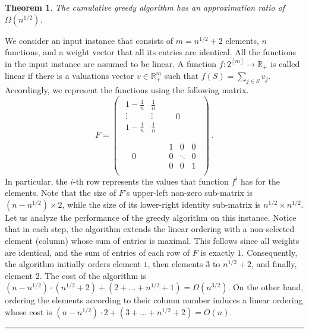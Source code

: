 \documentclass[11pt]{article}
\theoremstyle{plain}
\newtheorem{theorem}{Theorem}[section]
\theoremstyle{definition}
\newcommand{\qedsymb}{\hfill{\rule{2mm}{2mm}}}
\renewenvironment{proof}{\begin{trivlist} \item[\hspace{\labelsep}{\bf \noindent Proof.\/}] }{\qedsymb\end{trivlist}}\newenvironment{proofof}[1]{\begin{trivlist} \item[\hspace{\labelsep}{\bf \noindent Proof of #1.\/}] }{\qedsymb\end{trivlist}}\newenvironment{MyEqn}[1]{\setlength\arraycolsep{2pt}\begin{eqnarray*} #1}{\end{eqnarray*}}
\newcommand{\bbR}{\mathbb{R}}
\begin{document}
\begin{theorem} \label{thm:NonAdaptiveFail}
The cumulative greedy algorithm has an approximation ratio of
$\Omega(n^{1/2})$.
\end{theorem}
\begin{proof}
We consider an input instance that consists of $m = n^{1/2} + 2$
elements, $n$ functions, and a weight vector that all its entries
are identical. All the functions in the input instance are assumed
to be linear. A function $f: 2^{[m]} \to \bbR_+$ is called linear
if there is a valuations vector $v \in \bbR_+^m$ such that $f(S) =
\sum_{j \in S} v_j$. Accordingly, we represent the functions using
the following matrix.
$$
F = \left(
    \begin{array}{cc}
    \begin{array}{cc}
    1 - \frac{1}{n} & \frac{1}{n} \\
    \vdots&\vdots\\
    1 - \frac{1}{n} & \frac{1}{n} \\
    \end{array} &
    \begin{array}{ccc}
    \\
    & 0 & \\
    \\
    \end{array} \\
    \begin{array}{cc}
    \\
    & 0 \\
    \\
    \end{array} &
    \begin{array}{ccc}
    1 & 0 & 0 \\
    0 & \ddots & 0 \\
    0 & 0 & 1 \\
    \end{array}
    \end{array}
    \right) \ .
$$
In particular, the $i$-th row represents the values that function
$f^i$ has for the elements. Note that the size of $F$'s upper-left
non-zero sub-matrix is $(n - n^{1/2}) \times 2$, while the size of
its lower-right identity sub-matrix is $n^{1/2} \times n^{1/2}$.
Let us analyze the performance of the greedy algorithm on this
instance. Notice that in each step, the algorithm extends the
linear ordering with a non-selected element (column) whose sum of
entries is maximal. This follows since all weights are identical,
and the sum of entries of each row of $F$ is exactly $1$.
Consequently, the algorithm initially orders element $1$, then
elements $3$ to $n^{1/2}+2$, and finally, element $2$. The cost of
the algorithm is $(n - n^{1/2}) \cdot (n^{1/2} + 2) + (2 + \ldots
+ n^{1/2} + 1) = \Omega(n^{3/2})$. On the other hand, ordering the
elements according to their column number induces a linear
ordering whose cost is $(n - n^{1/2}) \cdot 2 + (3 + \ldots +
n^{1/2} + 2) = O(n)$.~
\end{proof}
\end{document}
